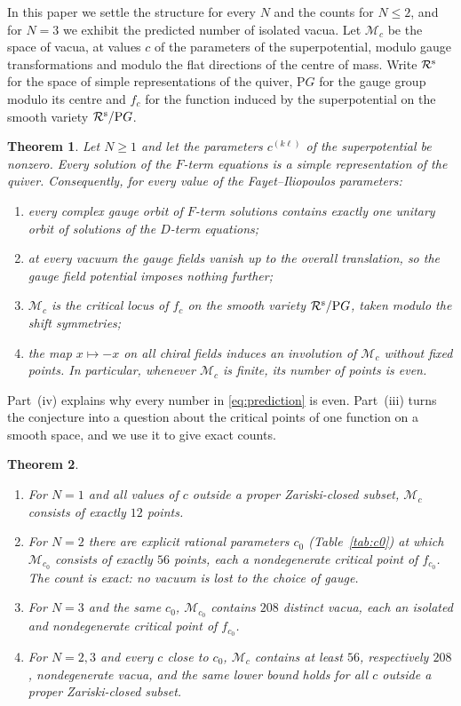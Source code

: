 \documentclass[11pt]{amsart}
\newtheorem{mainthm}{Theorem}
\theoremstyle{definition}
\newcommand{\cM}{\mathcal M}
\newcommand{\cR}{\mathcal R}
\newcommand{\PG}{\mathrm{P}G}
\begin{document}
In this paper we settle the structure for every $N$ and the counts for $N\le 2$, and for $N=3$ we exhibit the predicted number of isolated vacua. Let $\cM_c$ be the space of vacua, at values $c$ of the parameters of the superpotential, modulo gauge transformations and modulo the flat directions of the centre of mass. Write $\cR^{\rm s}$ for the space of simple representations of the quiver, $\PG$ for the gauge group modulo its centre and $f_c$ for the function induced by the superpotential on the smooth variety $\cR^{\rm s}/\PG$.

\begin{mainthm}\label{thm:A}
Let $N\ge1$ and let the parameters $c^{(k\ell)}$ of the superpotential be nonzero. Every solution of the $F$-term equations is a simple representation of the quiver. Consequently, for every value of the Fayet--Iliopoulos parameters:
\begin{enumerate}
\item every complex gauge orbit of $F$-term solutions contains exactly one unitary orbit of solutions of the $D$-term equations;
\item at every vacuum the gauge fields vanish up to the overall translation, so the gauge field potential imposes nothing further;
\item $\cM_c$ is the critical locus of $f_c$ on the smooth variety $\cR^{\rm s}/\PG$, taken modulo the shift symmetries;
\item the map $x\mapsto -x$ on all chiral fields induces an involution of $\cM_c$ without fixed points. In particular, whenever $\cM_c$ is finite, its number of points is even.
\end{enumerate}
\end{mainthm}

Part~(iv) explains why every number in \eqref{eq:prediction} is even. Part~(iii) turns the conjecture into a question about the critical points of one function on a smooth space, and we use it to give exact counts.

\begin{mainthm}\label{thm:B}
\begin{enumerate}
\item For $N=1$ and all values of $c$ outside a proper Zariski-closed subset, $\cM_c$ consists of exactly $12$ points.
\item For $N=2$ there are explicit rational parameters $c_0$ (Table~\ref{tab:c0}) at which $\cM_{c_0}$ consists of exactly $56$ points, each a nondegenerate critical point of $f_{c_0}$. The count is exact: no vacuum is lost to the choice of gauge.
\item For $N=3$ and the same $c_0$, $\cM_{c_0}$ contains $208$ distinct vacua, each an isolated and nondegenerate critical point of $f_{c_0}$.
\item For $N=2,3$ and every $c$ close to $c_0$, $\cM_c$ contains at least $56$, respectively $208$, nondegenerate vacua, and the same lower bound holds for all $c$ outside a proper Zariski-closed subset.
\end{enumerate}
\end{mainthm}
\end{document}

